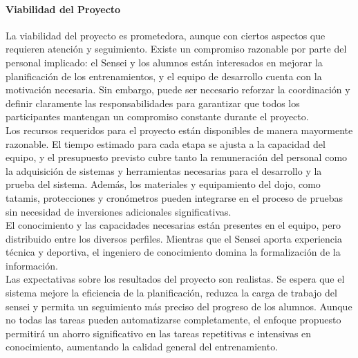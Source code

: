 \documentclass[12pt,a4paper,twoside,spanish]{article}      %
\begin{document}
       \paragraph{Viabilidad del Proyecto}


       La viabilidad del proyecto es prometedora, aunque con ciertos aspectos que requieren 
       atención y seguimiento. Existe un compromiso razonable por parte del personal implicado: 
       el Sensei y los alumnos están interesados en mejorar la planificación de los entrenamientos, 
       y el equipo de desarrollo cuenta con la motivación necesaria. Sin embargo, puede ser necesario 
       reforzar la coordinación y definir claramente las responsabilidades para 
       garantizar que todos los participantes mantengan un compromiso constante durante el proyecto.
       \\
       
       Los recursos requeridos para el proyecto están disponibles de manera mayormente razonable. El 
       tiempo estimado para cada etapa se ajusta a la capacidad del equipo, y el presupuesto previsto 
       cubre tanto la remuneración del personal como la adquisición de sistemas y herramientas necesarias 
       para el desarrollo y la prueba del sistema. Además, los materiales y equipamiento del dojo, como 
       tatamis, protecciones y cronómetros pueden integrarse en el proceso de pruebas sin necesidad de 
       inversiones adicionales significativas.
       \\
       
       El conocimiento y las capacidades necesarias están presentes en el equipo, pero distribuido entre 
       los diversos perfiles. Mientras que el Sensei aporta experiencia técnica y deportiva, el ingeniero 
       de conocimiento domina la formalización de la información.
       \\
       
       Las expectativas sobre los resultados del proyecto son realistas. Se espera que el sistema mejore 
       la eficiencia de la planificación, reduzca la carga de trabajo del sensei y permita un seguimiento 
       más preciso del progreso de los alumnos. Aunque no todas las tareas pueden automatizarse completamente, 
       el enfoque propuesto permitirá un ahorro significativo en las tareas repetitivas e intensivas en 
       conocimiento, aumentando la calidad general del entrenamiento.
       \\
       
\end{document}
